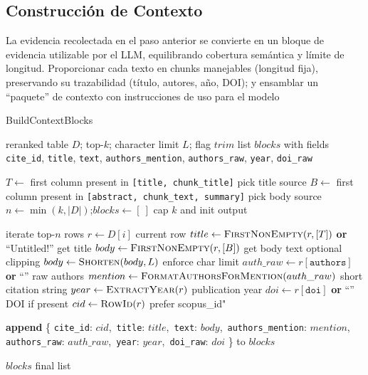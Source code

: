 \subsection{Construcción de Contexto}\label{subsec:construccion-de-contexto}
La evidencia recolectada en el paso anterior se convierte en un bloque de evidencia utilizable por el LLM, equilibrando cobertura semántica y límite de longitud. 
Proporcionar cada texto en chunks manejables (longitud fija), preservando su trazabilidad (título, autores, año, DOI); y ensamblar un “paquete” de contexto con instrucciones de uso para el modelo
\begin{algorithmEN}[H]
\caption{BuildContextBlocks}
\begin{algorithmic}[1]
\Require reranked table $D$; top-$k$; character limit $L$; flag $trim$
\Ensure list $blocks$ with fields \texttt{cite\_id}, \texttt{title}, \texttt{text}, \texttt{authors\_mention}, \texttt{authors\_raw}, \texttt{year}, \texttt{doi\_raw}

\State $T \gets$ first column present in \texttt{[title, chunk\_title]} \Comment pick title source
\State $B \gets$ first column present in \texttt{[abstract, chunk\_text, summary]} \Comment pick body source
\State $n \gets \min(k, |D|)$;\quad $blocks \gets [\ ]$ \Comment cap $k$ and init output

 \Comment iterate top-$n$ rows
  \State $r \gets D[i]$ \Comment current row
  \State $title \gets \textsc{FirstNonEmpty}(r,[T])$ \textbf{or} ``\!Untitled!'' \Comment get title
  \State $body \gets \textsc{FirstNonEmpty}(r,[B])$ \Comment get body text
   \Comment optional clipping
    \State $body \gets \textsc{Shorten}(body, L)$ \Comment enforce char limit
  \EndIf
  \State $auth\_raw \gets r[\texttt{authors}]$ \textbf{or} ``'' \Comment raw authors
  \State $mention \gets \textsc{FormatAuthorsForMention}(auth\_raw)$ \Comment short citation string
  \State $year \gets \textsc{ExtractYear}(r)$ \Comment publication year
  \State $doi \gets r[\texttt{doi}]$ \textbf{or} ``'' \Comment DOI if present
  \State $cid \gets \textsc{RowId}(r)$ \Comment prefer scopus\_id"

  \State \textbf{append} \{
    \texttt{cite\_id}: $cid$,\,
    \texttt{title}: $title$,\,
    \texttt{text}: $body$,\,
    \texttt{authors\_mention}: $mention$,\,
    \texttt{authors\_raw}: $auth\_raw$,\,
    \texttt{year}: $year$,\,
    \texttt{doi\_raw}: $doi$
  \} to $blocks$ 
\EndFor

\State \Return $blocks$ \Comment final list
\end{algorithmic}
\end{algorithmEN}

